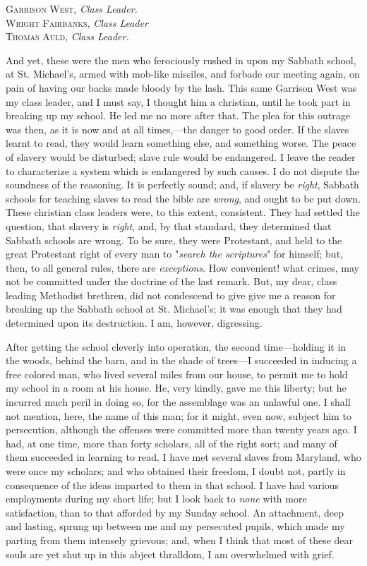 \textsc{Garrison West}, \emph{Class Leader.}\\
\textsc{Wright Fairbanks}, \emph{Class Leader}\\
\textsc{Thomas Auld}, \emph{Class Leader.}

And yet, these were the men who ferociously rushed in upon my Sabbath
school, at St. Michael's, armed with mob-like missiles, and forbade our
meeting again, on pain of having our backs made bloody by the lash. This
same Garrison West was my class leader, and I must say, I thought him a
christian, until he took part in breaking up my school. He led me no
more after that. The plea for this outrage was then, as it is now and at
all times,---the danger to good order. If the slaves learnt to read,
they would learn something else, and something worse. The peace of
slavery would be disturbed; slave rule would be endangered. I leave the
reader to characterize a system which is endangered by such causes. I do
not dispute the soundness of the reasoning. It is perfectly sound; and,
if slavery be \emph{right}, Sabbath schools for teaching slaves to read
the bible are \emph{wrong}, and ought to be put down. These christian
class leaders were, to this extent, consistent. They had settled the
question, that slavery is \emph{right}, and, by that standard, they
determined that Sabbath schools are wrong. To be sure, they were
Protestant, and held to the great Protestant right of every man to
"\emph{search the scriptures}" for himself; but, then, to all general
rules, there are \emph{exceptions}. How convenient! what crimes, may not
{\protect\hypertarget{267}{}{}}be committed under the doctrine of the
last remark. But, my dear, class leading Methodist brethren, did not
condescend to give give me a reason for breaking up the Sabbath school
at St. Michael's; it was enough that they had determined upon its
destruction. I am, however, digressing.

After getting the school cleverly into operation, the second
time---holding it in the woods, behind the barn, and in the shade of
trees---I succeeded in inducing a free colored man, who lived several
miles from our house, to permit me to hold my school in a room at his
house. He, very kindly, gave me this liberty; but he incurred much peril
in doing so, for the assemblage was an unlawful one. I shall not
mention, here, the name of this man; for it might, even now, subject him
to persecution, although the offenses were committed more than twenty
years ago. I had, at one time, more than forty scholars, all of the
right sort; and many of them succeeded in learning to read. I have met
several slaves from Maryland, who were once my scholars; and who
obtained their freedom, I doubt not, partly in consequence of the ideas
imparted to them in that school. I have had various employments during
my short life; but I look back to \emph{none} with more satisfaction,
than to that afforded by my Sunday school. An attachment, deep and
lasting, sprung up between me and my persecuted pupils, which made my
parting from them intensely grievous; and, when I think that most of
these dear souls are yet shut up in this abject thralldom, I am
overwhelmed with grief.

